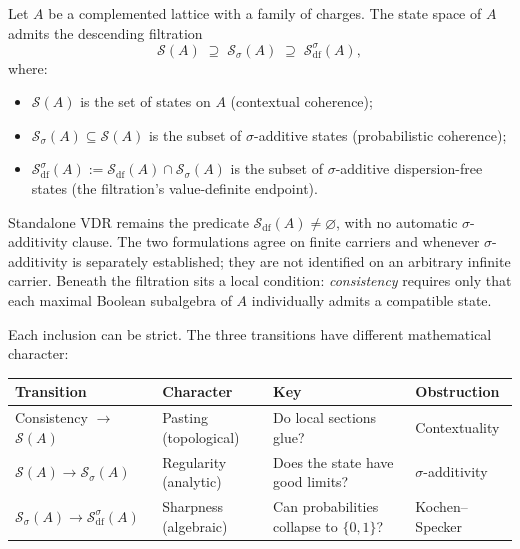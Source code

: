 \begin{definition}
\label{def:hierarchy}
Let $A$ be a complemented lattice with a family of charges.
The state space of $A$ admits the descending filtration
\[
  \mathcal{S}(A)
  \;\supseteq\;
  \mathcal{S}_\sigma(A)
  \;\supseteq\;
  \mathcal{S}_{\mathrm{df}}^\sigma(A),
\]
where:
\begin{itemize}
  \item $\mathcal{S}(A)$ is the set of states on $A$
    (contextual coherence);
  \item $\mathcal{S}_\sigma(A) \subseteq \mathcal{S}(A)$ is the
    subset of $\sigma$-additive states
    (probabilistic coherence);
  \item $\mathcal{S}_{\mathrm{df}}^\sigma(A):=
    \mathcal{S}_{\mathrm{df}}(A)\cap\mathcal{S}_\sigma(A)$ is the subset of
    $\sigma$-additive dispersion-free states (the filtration's
    value-definite endpoint).
\end{itemize}
Standalone VDR remains the predicate
$\mathcal{S}_{\mathrm{df}}(A)\ne\varnothing$, with no automatic
$\sigma$-additivity clause.  The two formulations agree on finite carriers
and whenever $\sigma$-additivity is separately established; they are not
identified on an arbitrary infinite carrier.
Beneath the filtration sits a local condition:
\emph{consistency} requires only that each maximal Boolean
subalgebra of $A$ individually admits a compatible state.
\end{definition}

\noindent Each inclusion can be strict.  The three transitions have
different mathematical character:

\medskip
\begin{center}
\begin{tabular}{@{}llll@{}}
\toprule
Transition & Character & Key & Obstruction \\
\midrule
Consistency $\to$ $\mathcal{S}(A)$
  & Pasting (topological)
  & Do local sections glue?
  & Contextuality \\[3pt]
$\mathcal{S}(A) \to \mathcal{S}_\sigma(A)$
  & Regularity (analytic)
  & Does the state have good limits?
  & $\sigma$-additivity \\[3pt]
$\mathcal{S}_\sigma(A) \to \mathcal{S}_{\mathrm{df}}^\sigma(A)$
  & Sharpness (algebraic)
  & Can probabilities collapse to $\{0,1\}$?
  & Kochen--Specker \\
\bottomrule
\end{tabular}
\end{center}
\medskip

